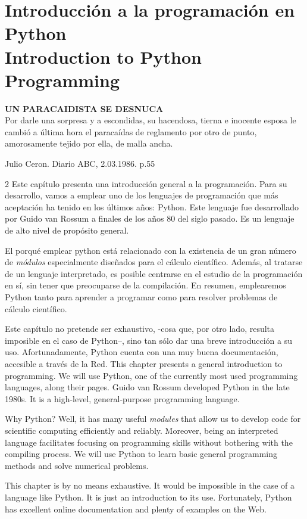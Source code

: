 \chapter{Introducción a la programación en Python\\ Introduction to Python Programming}\label{ch:intpr}  
\epigraph{\textbf{UN PARACAIDISTA SE DESNUCA}\\ Por darle una sorpresa y a escondidas, su hacendosa, tierna e inocente esposa le cambió a última hora el paracaídas de reglamento por otro de punto, amorosamente tejido por ella, de malla ancha.}{Julio Ceron. Diario ABC, 2.03.1986. p.55}
\begin{paracol}{2}
Este capítulo presenta una introducción general a la programación. Para su desarrollo, vamos a emplear uno de los lenguajes de programación que más aceptación ha tenido en los últimos años: Python. Este lenguaje fue desarrollado por Guido van Rossum a finales de los años 80 del siglo pasado. Es un lenguaje de alto nivel de propósito general.

El porqué emplear python está relacionado con la existencia de un gran número de \emph{módulos} especialmente diseñados para el cálculo científico. Además, al tratarse de un lenguaje interpretado, es posible centrarse en el estudio de la programación en sí, sin tener que preocuparse de la compilación. En resumen, emplearemos Python tanto para aprender a programar como para resolver problemas de cálculo científico.

Este capítulo no pretende ser exhaustivo, -cosa que, por otro lado, resulta imposible en el caso de Python--, sino tan sólo dar una breve introducción a su uso. Afortunadamente, Python cuenta con una muy buena documentación, accesible a través de la Red. 
\switchcolumn 
This chapter presents a general introduction to programming. We will use Python, one of the currently most used programming languages, along their pages. Guido van Rossum developed Python in the late 1980s. It is a high-level, general-purpose programming language. 

Why Python? Well, it has many useful \emph{modules} that allow us to develop code for scientific computing efficiently and reliably. Moreover, being an interpreted language facilitates focusing on programming skills without bothering with the compiling process. We will use Python to learn basic general programming methods and solve numerical problems.

This chapter is by no means exhaustive. It would be impossible in the case of a language like Python. It is just an introduction to its use. Fortunately, Python has excellent online documentation and plenty of examples on the Web. 
\end{paracol}


